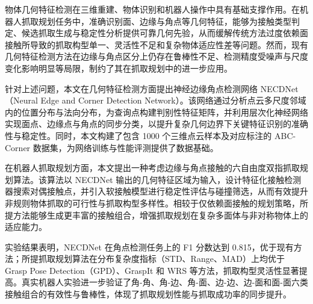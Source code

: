 ﻿%
\begin{cabstract}
物体几何特征检测在三维重建、物体识别和机器人操作中具有基础支撑作用。在机器人抓取规划任务中，准确识别面、边缘与角点等几何特征，能够为接触类型判定、候选抓取生成与稳定性分析提供可靠几何先验，从而缓解传统方法过度依赖面接触所导致的抓取构型单一、灵活性不足和复杂物体适应性差等问题。然而，现有几何特征检测方法在边缘与角点区分上仍存在鲁棒性不足、检测精度受噪声与尺度变化影响明显等局限，制约了其在抓取规划中的进一步应用。

针对上述问题，本文在几何特征检测方面提出神经边缘角点检测网络 NECDNet（Neural Edge and Corner Detection Network）。该网络通过分析点云多尺度邻域内的位置分布与法向分布，为查询点构建判别性特征矩阵，并利用层次化神经网络实现面点、边缘点与角点的同步分类，以提升复杂几何边界下关键特征识别的准确性与稳定性。同时，本文构建了包含 1000 个三维点云样本及对应标注的 ABC-Corner 数据集，为网络训练与性能评测提供了数据基础。

在机器人抓取规划方面，本文提出一种考虑边缘与角点接触的六自由度双指抓取规划算法。该算法以 NECDNet 输出的几何特征区域为输入，设计特征化接触检测器搜索对偶接触点，并引入软接触模型进行稳定性评估与碰撞筛选，从而有效提升非规则物体抓取的可行性与抓取构型多样性。相较于仅依赖面接触的规划策略，所提方法能够生成更丰富的接触组合，增强抓取规划在复杂多面体与非对称物体上的适应能力。

实验结果表明，NECDNet 在角点检测任务上的 F1 分数达到 0.815，优于现有方法；所提抓取规划算法在分布复杂度指标（STD、Range、MAD）上均优于 Grasp Pose Detection（GPD）、GraspIt 和 WRS 等方法，抓取构型灵活性显著提高。真实机器人实验进一步验证了角-角、角-边、角-面、边-边、边-面和面-面六类接触组合的有效性与鲁棒性，体现了抓取规划性能与抓取成功率的同步提升。
\end{cabstract}


